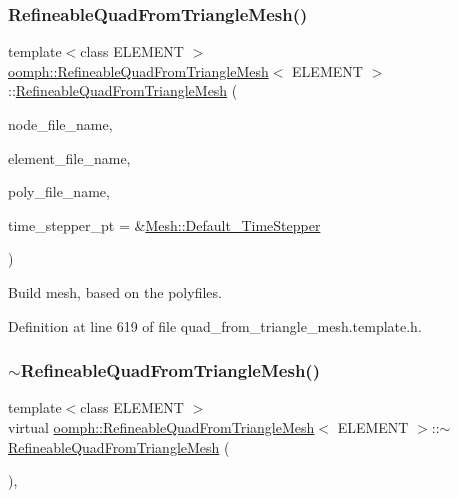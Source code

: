 \subsubsection{\texorpdfstring{Refineable\+Quad\+From\+Triangle\+Mesh()}{RefineableQuadFromTriangleMesh()}\hspace{0.1cm}{\footnotesize\ttfamily [2/2]}}
{\footnotesize\ttfamily template$<$class E\+L\+E\+M\+E\+NT $>$ \\
\hyperlink{classoomph_1_1RefineableQuadFromTriangleMesh}{oomph\+::\+Refineable\+Quad\+From\+Triangle\+Mesh}$<$ E\+L\+E\+M\+E\+NT $>$\+::\hyperlink{classoomph_1_1RefineableQuadFromTriangleMesh}{Refineable\+Quad\+From\+Triangle\+Mesh} (\begin{DoxyParamCaption}\item[{const std\+::string \&}]{node\+\_\+file\+\_\+name,  }\item[{const std\+::string \&}]{element\+\_\+file\+\_\+name,  }\item[{const std\+::string \&}]{poly\+\_\+file\+\_\+name,  }\item[{\hyperlink{classoomph_1_1TimeStepper}{Time\+Stepper} $\ast$}]{time\+\_\+stepper\+\_\+pt = {\ttfamily \&\hyperlink{classoomph_1_1Mesh_a12243d0fee2b1fcee729ee5a4777ea10}{Mesh\+::\+Default\+\_\+\+Time\+Stepper}} }\end{DoxyParamCaption})\hspace{0.3cm}{\ttfamily [inline]}}



Build mesh, based on the polyfiles. 



Definition at line 619 of file quad\+\_\+from\+\_\+triangle\+\_\+mesh.\+template.\+h.

\mbox{\label{classoomph_1_1RefineableQuadFromTriangleMesh_aaa5c1de240765e38b30f2a10613faf59}} 
\subsubsection{\texorpdfstring{$\sim$\+Refineable\+Quad\+From\+Triangle\+Mesh()}{~RefineableQuadFromTriangleMesh()}}
{\footnotesize\ttfamily template$<$class E\+L\+E\+M\+E\+NT $>$ \\
virtual \hyperlink{classoomph_1_1RefineableQuadFromTriangleMesh}{oomph\+::\+Refineable\+Quad\+From\+Triangle\+Mesh}$<$ E\+L\+E\+M\+E\+NT $>$\+::$\sim$\hyperlink{classoomph_1_1RefineableQuadFromTriangleMesh}{Refineable\+Quad\+From\+Triangle\+Mesh} (\begin{DoxyParamCaption}{ }\end{DoxyParamCaption})\hspace{0.3cm}{\ttfamily [inline]}, {\ttfamily [virtual]}}



